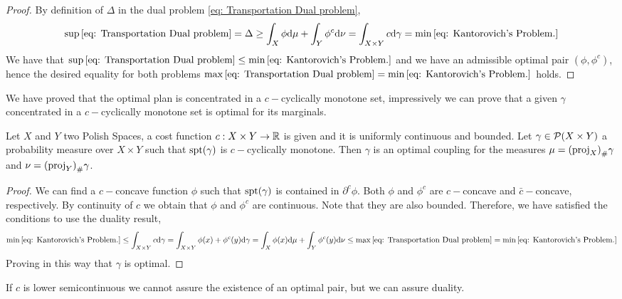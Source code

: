\begin{proof}
By definition of $\Delta$ in the dual problem \eqref{eq: Transportation Dual problem},
	\begin{equation}
		\sup\eqref{eq: Transportation Dual problem}=\Delta \geq \int_{X}\phi\mathrm{d}\mu +\int_{Y}\phi^c\mathrm{d}\nu = \int_{X\times Y}c\mathrm{d}\gamma=\min\eqref{eq: Kantorovich's Problem.}
	\end{equation}  
	We have that $\sup\eqref{eq: Transportation Dual problem}\leq \min\eqref{eq: Kantorovich's Problem.}$ and we have an admissible optimal pair $(\phi, \phi^c)$, hence the desired equality for both problems $\max\eqref{eq: Transportation Dual problem}= \min\eqref{eq: Kantorovich's Problem.}$ holds.
\end{proof}
We have proved that the optimal plan is concentrated in a $c-$cyclically monotone set, impressively we can prove that a given $\gamma$ concentrated in a $c-$cyclically monotone set is optimal for its marginals.
\begin{theorem}
	Let $X$ and $Y$ two Polish Spaces, a cost function $c:X\times Y \rightarrow \mathbb{R}$ is given and it is uniformly continuous and bounded. Let $\gamma\in \mathcal{P}(X\times Y)$ a probability measure over $X\times Y$ such that $\mathrm{spt}(\gamma)$ is $c-$cyclically monotone. Then $\gamma$ is an optimal coupling for the measures $\mu={(\mathrm{proj}_X)}_{\#} \gamma$ and $\nu={(\mathrm{proj}_Y)}_{\#} \gamma$. 
\end{theorem} 
\begin{proof}
	We can find a $c-$concave function $\phi$  such that $\mathrm{spt}(\gamma)$ is contained in $\partial^c\phi$.  Both $\phi$ and $\phi^c$ are $c-$concave and $\bar c-$concave, respectively. By continuity of $c$ we obtain that $\phi$ and $\phi^c$ are continuous. Note that they are also bounded.
	Therefore, we have satisfied the conditions to use the duality result,
	\begin{equation*}
		\min\eqref{eq: Kantorovich's Problem.} \leq \int_{X\times Y}c\mathrm{d}\gamma = \int_{X\times Y} \phi(x)+\phi^c(y)\mathrm{d}\gamma= \int_{X} \phi(x)\mathrm{d}\mu+\int_{Y}\phi^c(y)\mathrm{d}\nu\leq \max\eqref{eq: Transportation Dual problem}=\min \eqref{eq: Kantorovich's Problem.} 
	\end{equation*} 
	Proving in this way that $\gamma$ is optimal.
\end{proof}
If $c$ is lower semicontinuous we cannot assure the existence of an optimal pair, but we can assure duality.
